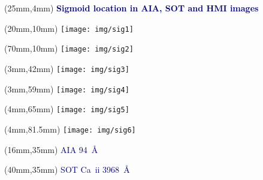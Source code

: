 \documentclass{beamer}
\begin{document}
\begin{frame}
 
 
 
% 

\begin{textblock*}{80mm}(25mm,4mm)
\small \bf \textcolor{darkblue}{Sigmoid location in AIA, SOT and HMI images}
 \end{textblock*}

\begin{textblock*}{70mm}(20mm,10mm)
\texttt{[image: img/sig1]}
\end{textblock*}
\begin{textblock*}{70mm}(70mm,10mm)
\texttt{[image: img/sig2]}
\end{textblock*}

\begin{textblock*}{200mm}(3mm,42mm)
\texttt{[image: img/sig3]}
\end{textblock*}
\begin{textblock*}{200mm}(3mm,59mm)
\texttt{[image: img/sig4]}
\end{textblock*} 

\begin{textblock*}{205mm}(4mm,65mm)
\texttt{[image: img/sig5]}
\end{textblock*}
\begin{textblock*}{210mm}(4mm,81.5mm)
\texttt{[image: img/sig6]}
\end{textblock*} 
 
\begin{textblock*}{40mm}(16mm,35mm)
\scriptsize \textcolor{darkblue}{AIA 94~{\AA}}
\end{textblock*}
\begin{textblock*}{40mm}(40mm,35mm)
\scriptsize \textcolor{darkblue}{SOT Ca~{\sc ii} 3968~{\AA}}
\end{textblock*} 
  

\end{frame}
\end{document}

